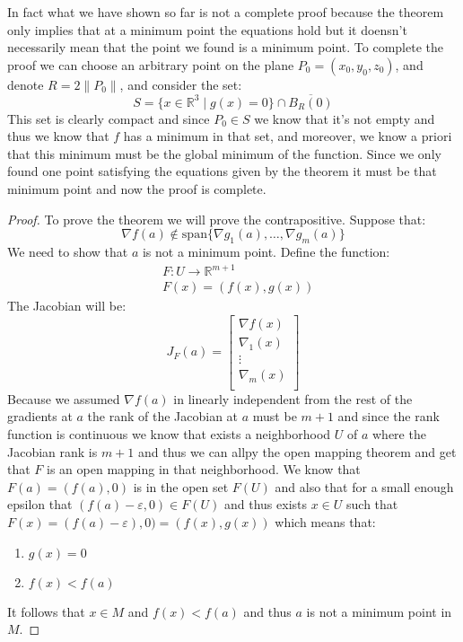 \documentclass[11pt,a4paper]{article}
\theoremstyle{definition}
\theoremstyle{plain}
\newcommand{\R}{\mathbb{R}}
\begin{document}
	\newpage
	
	In fact what we have shown so far is not a complete proof because
	the theorem only implies that at a minimum point the equations hold
	but it doensn't necessarily mean that the point we found is a minimum
	point. To complete the proof we can choose an arbitrary point on the
	plane $P_0 = (x_0,y_0,z_0)$, and denote $R = 2\|P_0\|$, and consider
	the set:
	\[
		S = \{x \in \R^3 \mid g(x) = 0\} \cap \overline{B_R(0)}
	\]
	This set is clearly compact and since $P_0 \in S$ we know that it's not 
	empty and thus we know that $f$ has a minimum in that set, and moreover,
	we know a priori that this minimum must be the global minimum of the
	function. Since we only found one point satisfying the equations given
	by the theorem it must be that minimum point and now the proof is 
	complete.
	
	\begin{proof}
		To prove the theorem we will prove the contrapositive. Suppose that:
		\[
			\nabla f(a) \notin 
			\mathrm{span}\{\nabla g_1(a),\dots,\nabla g_m(a)\}
		\]
		We need to show that $a$ is not a minimum point. Define the function:
		\begin{align*}
			&F \colon U \to \R^{m+1} \\
			&F(x) = (f(x),g(x))
		\end{align*}
		The Jacobian will be:
		\[
		J_F(a) = 
			\begin{bmatrix}
				\nabla f(x)\\
				\nabla_1(x)\\
				\vdots\\
				\nabla_m(x)\\
			\end{bmatrix}
		\]
		Because we assumed $\nabla f(a)$ in linearly independent from the
		rest of the gradients at $a$ the rank of the Jacobian at $a$ must
		be $m + 1$ and since the rank function is continuous we know that
		exists a neighborhood $U$ of $a$ where the Jacobian rank is $m + 1$
		and thus we can allpy the open mapping theorem and get that $F$
		is an open mapping in that neighborhood. We know that 
		$F(a) = (f(a), 0)$ is in the open set $F(U)$ and also that for a small
		enough epsilon that $(f(a) - \varepsilon, 0) \in F(U)$ and thus
		exists $x \in U$ such that 
		$F(x) = (f(a) - \varepsilon), 0) = (f(x), g(x))$ which means that:
		\begin{enumerate}
			\item $g(x) = 0$
			\item $f(x) < f(a)$
		\end{enumerate}
		It follows that $x \in M$ and $f(x) < f(a)$ and thus $a$ is not
		a minimum point in $M$.
	\end{proof}
	
\end{document}

